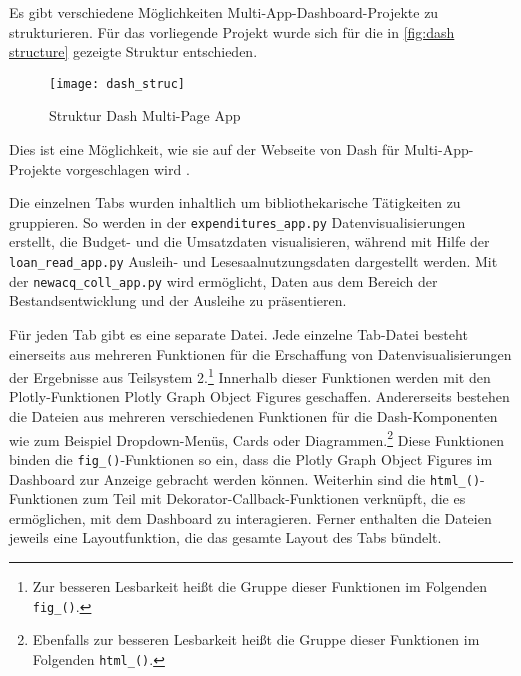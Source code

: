     Es gibt verschiedene Möglichkeiten Multi-App-Dashboard-Projekte zu strukturieren. Für das vorliegende Projekt wurde sich für die in 
    \autoref{fig:dash structure} gezeigte Struktur entschieden.

    \begin{figure}[H]
        \centering
            \texttt{[image: dash\_struc]}
            \caption{Struktur Dash Multi-Page App}
            \label{fig:dash structure}
    \end{figure}
    
    Dies ist eine Möglichkeit, wie sie auf der Webseite von Dash für Multi-App-Projekte vorgeschlagen wird \cite[vgl.][]{plotly_url_2021}.
    
    Die einzelnen Tabs wurden inhaltlich um bibliothekarische Tätigkeiten zu gruppieren. So werden in der \texttt{expenditures\_app.py}
    Datenvisualisierungen erstellt, die Budget- und die Umsatzdaten visualisieren, während mit Hilfe der \texttt{loan\_read\_app.py}
    Ausleih- und Lesesaalnutzungsdaten dargestellt werden. Mit der \texttt{newacq\_coll\_app.py} wird ermöglicht, Daten aus dem Bereich der Bestandsentwicklung und der 
    Ausleihe zu präsentieren.

    Für jeden Tab gibt es eine separate Datei. Jede einzelne Tab-Datei besteht einerseits aus mehreren Funktionen für die Erschaffung von Datenvisualisierungen der
    Ergebnisse aus Teilsystem 2.\footnote{Zur besseren Lesbarkeit heißt die Gruppe dieser Funktionen im Folgenden \texttt{fig\_()}.}
    Innerhalb dieser Funktionen werden mit den Plotly-Funktionen Plotly Graph Object Figures geschaffen. 
    Andererseits bestehen die Dateien aus mehreren verschiedenen Funktionen für die Dash-Komponenten wie zum Beispiel Dropdown-Menüs, Cards oder Diagrammen.\footnote{Ebenfalls zur besseren Lesbarkeit
    heißt die Gruppe dieser Funktionen im Folgenden \texttt{html\_()}.}
    Diese Funktionen binden die \texttt{fig\_()}-Funktionen so ein, dass die Plotly Graph Object Figures im Dashboard zur Anzeige gebracht werden können. 
    Weiterhin sind die \texttt{html\_()}-Funktionen zum Teil mit Dekorator-Callback-Funktionen verknüpft, die es ermöglichen, mit dem Dashboard zu interagieren. 
    Ferner enthalten die Dateien jeweils eine Layoutfunktion, die das gesamte Layout des Tabs bündelt.


